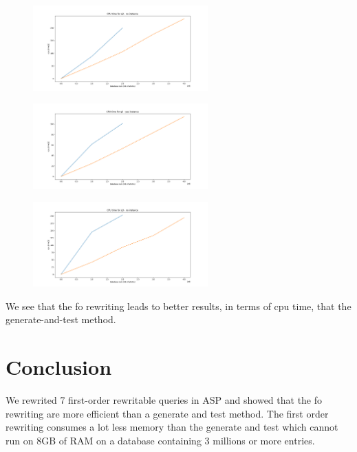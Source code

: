 \begin{figure}[H]
\includegraphics[width=0.6\textwidth]{time_q2_noinstance.png}
\centering
\end{figure}

\begin{figure}[H]
\includegraphics[width=0.6\textwidth]{time_q3_yesinstance.png}
\centering
\end{figure}

\begin{figure}[H]
\includegraphics[width=0.6\textwidth]{time_q3_noinstance.png}
\centering
\end{figure}

We see that the fo rewriting leads to better results, in terms of cpu time, that the generate-and-test method.

\section{Conclusion}

We rewrited 7 first-order rewritable queries in ASP and showed that the fo rewriting are more efficient than a generate and test method. The first order rewriting consumes a lot less memory than the generate and test which cannot run on 8GB of RAM on a database containing 3 millions or more entries.
